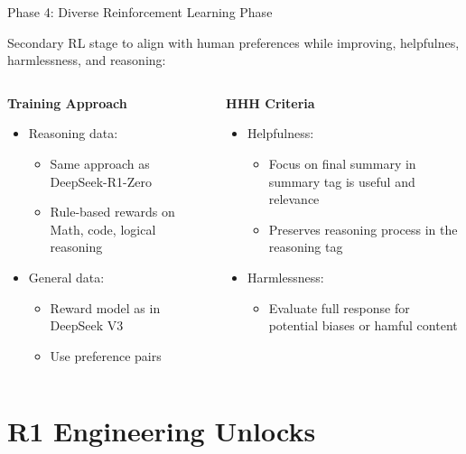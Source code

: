 \documentclass[8pt]{beamer}
\begin{document}
\begin{frame}{Phase 4: Diverse Reinforcement Learning Phase}

Secondary RL stage to align with human preferences while improving, helpfulnes, harmlessness, and reasoning:

\vspace{1em}

\begin{columns}[t]
\begin{column}{0.5\textwidth}
\textbf{Training Approach}
\begin{itemize}
\item Reasoning data:
    \begin{itemize}
    \item Same approach as DeepSeek-R1-Zero
    \item Rule-based rewards on Math, code, logical reasoning
    \end{itemize}
\item General data:
    \begin{itemize}
    \item Reward model as in DeepSeek V3
    \item Use preference pairs
    \end{itemize}
\end{itemize}
\end{column}

\begin{column}{0.5\textwidth}
\textbf{HHH Criteria}
\begin{itemize}
\item Helpfulness:
    \begin{itemize}
    \item Focus on final summary in summary tag is useful and relevance
    \item Preserves reasoning process in the reasoning tag
    \end{itemize}
\item Harmlessness:
    \begin{itemize}
    \item Evaluate full response for potential biases or hamful content
    \end{itemize}
\end{itemize}
\end{column}
\end{columns}

\end{frame}

\section{R1 Engineering Unlocks}
\end{document}
